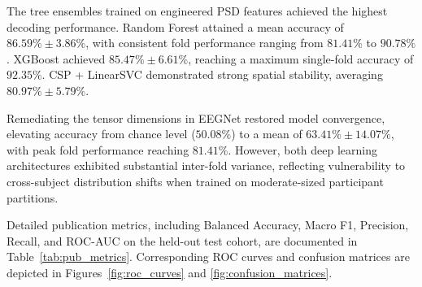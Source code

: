 \documentclass[review,12pt]{elsarticle}
\begin{document}
\begin{table}[htbp]
\centering
\caption{Cross-Subject Locomotion Decoding Performance Under 5-Fold GroupKFold}
\label{tab:benchmark}
\vspace{0.4em}
\end{table}

The tree ensembles trained on engineered PSD features achieved the highest decoding performance. Random Forest attained a mean accuracy of $86.59\% \pm 3.86\%$, with consistent fold performance ranging from $81.41\%$ to $90.78\%$. XGBoost achieved $85.47\% \pm 6.61\%$, reaching a maximum single-fold accuracy of $92.35\%$. CSP + LinearSVC demonstrated strong spatial stability, averaging $80.97\% \pm 5.79\%$. 

Remediating the tensor dimensions in EEGNet restored model convergence, elevating accuracy from chance level ($50.08\%$) to a mean of $63.41\% \pm 14.07\%$, with peak fold performance reaching $81.41\%$. However, both deep learning architectures exhibited substantial inter-fold variance, reflecting vulnerability to cross-subject distribution shifts when trained on moderate-sized participant partitions.

Detailed publication metrics, including Balanced Accuracy, Macro F1, Precision, Recall, and ROC-AUC on the held-out test cohort, are documented in Table~\ref{tab:pub_metrics}. Corresponding ROC curves and confusion matrices are depicted in Figures~\ref{fig:roc_curves} and \ref{fig:confusion_matrices}.
\end{document}
